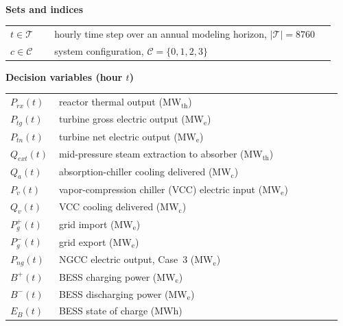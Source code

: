 \documentclass[a4paper,fleqn]{cas-sc}
\begin{document}
\maketitle

\begingroup
{}\label{sec:nomen}\\[6pt]
\renewcommand{\arraystretch}{1.05}
\noindent
\begin{minipage}[t]{0.49\linewidth}
\noindent\textbf{Sets and indices}\par\smallskip
\begin{tabular}{@{}p{0.13\linewidth}p{0.83\linewidth}@{}}
$t \in \mathcal{T}$ & hourly time step over an annual modeling horizon, $|\mathcal{T}|=8760$ \\
$c \in \mathcal{C}$ & system configuration, $\mathcal{C}=\{0,1,2,3\}$ \\
\end{tabular}

\par\medskip
\noindent\textbf{Decision variables (hour $t$)}\par\smallskip
\begin{tabular}{@{}p{0.13\linewidth}p{0.83\linewidth}@{}}
$P_{rx}(t)$         & reactor thermal output (MW$_\mathrm{th}$) \\
$P_{tg}(t)$         & turbine gross electric output (MW$_\mathrm{e}$) \\
$P_{tn}(t)$         & turbine net electric output (MW$_\mathrm{e}$) \\
$Q_{ext}(t)$        & mid-pressure steam extraction to absorber (MW$_\mathrm{th}$) \\
$Q_{a}(t)$          & absorption-chiller cooling delivered (MW$_\mathrm{c}$) \\
$P_{v}(t)$          & vapor-compression chiller (VCC) electric input (MW$_\mathrm{e}$) \\
$Q_{v}(t)$          & VCC cooling delivered (MW$_\mathrm{c}$) \\
$P_{g}^{+}(t)$      & grid import (MW$_\mathrm{e}$) \\
$P_{g}^{-}(t)$      & grid export (MW$_\mathrm{e}$) \\
$P_{ng}(t)$         & NGCC electric output, Case~3 (MW$_\mathrm{e}$) \\
$B^{+}(t)$          & BESS charging power (MW$_\mathrm{e}$) \\
$B^{-}(t)$          & BESS discharging power (MW$_\mathrm{e}$) \\
$E_{B}(t)$          & BESS state of charge (MWh) \\
\end{tabular}


\end{minipage}
\end{document}

